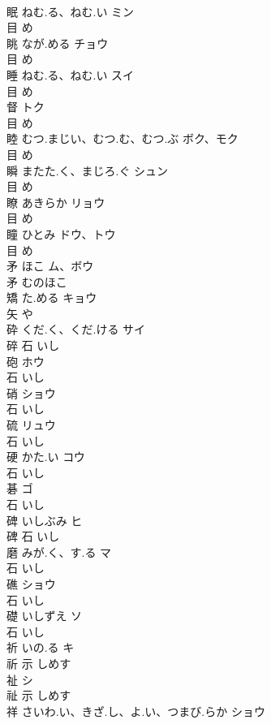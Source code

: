 \documentclass[8pt]{extreport}
\begin{document}
\begin{CJK}{UTF8}{min}
\\	眠	ねむ.る、ねむ.い	ミン	
\\	目		め		
\\	眺	なが.める	チョウ	
\\	目		め		
\\	睡	ねむ.る、ねむ.い	スイ	
\\	目		め		
\\	督		トク	
\\	目		め		
\\	睦	むつ.まじい、むつ.む、むつ.ぶ	ボク、モク	
\\	目		め		
\\	瞬	またた.く、まじろ.ぐ	シュン	
\\	目		め		
\\	瞭	あきらか	リョウ	
\\	目		め		
\\	瞳	ひとみ	ドウ、トウ	
\\	目		め		
\\	矛	ほこ	ム、ボウ	
\\	矛		むのほこ		
\\	矯	た.める	キョウ	
\\	矢		や		
\\	砕	くだ.く、くだ.ける	サイ	
\\	碎	石		いし		
\\	砲		ホウ	
\\	石		いし		
\\	硝		ショウ	
\\	石		いし		
\\	硫		リュウ	
\\	石		いし		
\\	硬	かた.い	コウ	
\\	石		いし		
\\	碁		ゴ	
\\	石		いし		
\\	碑	いしぶみ	ヒ	
\\	碑	石		いし		
\\	磨	みが.く、す.る	マ	
\\	石		いし		
\\	礁		ショウ	
\\	石		いし		
\\	礎	いしずえ	ソ	
\\	石		いし		
\\	祈	いの.る	キ	
\\	祈	示		しめす		
\\	祉		シ	
\\	祉	示		しめす		
\\	祥	さいわ.い、きざ.し、よ.い、つまび.らか	ショウ	

\end{CJK}
\end{document}
